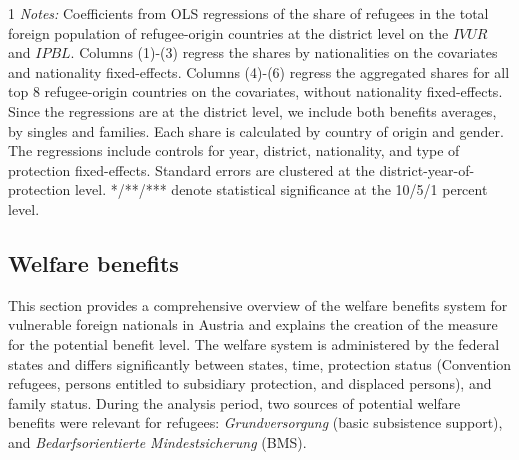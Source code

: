 \begin{table}
\centering
	\caption{Correlation of initial vacancy-to-unemployment ratio and initial potential benefit level with the share of refugees in a district}
	\label{tab:assd_statcube}
	\begin{threeparttable}
 \centering
			
  \vspace{-0.7cm}
		\begin{tablenotes} 
			\begin{footnotesize}
				\begin{spacing}{1}
					\textit{Notes:} Coefficients from OLS regressions of the share of refugees in the total foreign population of refugee-origin countries at the district level on the $IVUR$ and $IPBL$. Columns (1)-(3) regress the shares by nationalities on the covariates and nationality fixed-effects. Columns (4)-(6) regress the aggregated shares for all top 8 refugee-origin countries on the covariates, without nationality fixed-effects. Since the regressions are at the district level, we include both benefits averages, by singles and families. Each share is calculated by country of origin and gender. The regressions include controls for year, district, nationality, and type of protection fixed-effects. Standard errors are clustered at the district-year-of-protection level. */**/*** denote statistical significance at the 10/5/1 percent level.
				\end{spacing}
			\end{footnotesize}
		\end{tablenotes}
	\end{threeparttable}
\end{table}

\clearpage


\subsection{Welfare benefits}\label{subsec:welfare}
\FloatBarrier

This section provides a comprehensive overview of the welfare benefits system for vulnerable foreign nationals in Austria and explains the creation of the measure for the potential benefit level. The welfare system is administered by the federal states and differs significantly between states, time, protection status (Convention refugees, persons entitled to subsidiary protection, and displaced persons), and family status. During the analysis period, two sources of potential welfare benefits were relevant for refugees: \textit{Grundversorgung} (basic subsistence support), and \textit{Bedarfsorientierte Mindestsicherung} (BMS). 


